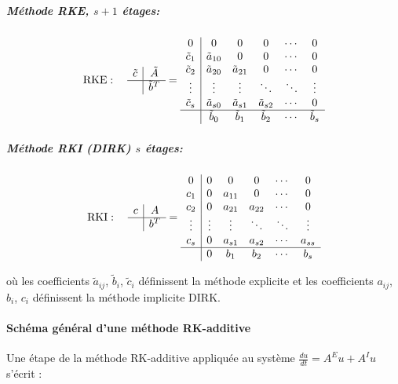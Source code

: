         \subparagraph{Méthode RKE, $s+1$ étages:}
        \begin{align}
        \text{RKE} : \quad
        \begin{array}{c|c}
        \tilde{c} & \tilde{A} \\
        \hline
        & \tilde{b}^T
        \end{array}
        =
        \begin{array}{c|ccccc}
        0 & 0 & 0 & 0 & \cdots & 0 \\
        \tilde{c}_1 & \tilde{a}_{10} & 0 & 0 & \cdots & 0 \\
        \tilde{c}_2 & \tilde{a}_{20} & \tilde{a}_{21} & 0 & \cdots & 0 \\
        \vdots & \vdots & \vdots & \ddots & \ddots & \vdots \\
        \tilde{c}_s & \tilde{a}_{s0} & \tilde{a}_{s1} & \tilde{a}_{s2} & \cdots & 0 \\
        \hline
        & \tilde{b}_0 & \tilde{b}_1 & \tilde{b}_2 & \cdots & \tilde{b}_s
        \end{array}
        \end{align}
        
        \subparagraph{Méthode RKI (DIRK) $s$ étages:}
        \begin{align}
        \text{RKI} : \quad
        \begin{array}{c|c}
        c & A \\
        \hline
        & b^T
        \end{array}
        =
        \begin{array}{c|ccccc}
        0 & 0 & 0 & 0 & \cdots & 0 \\
        c_1 & 0 & a_{11} & 0 & \cdots & 0 \\
        c_2 & 0 & a_{21} & a_{22} & \cdots & 0 \\
        \vdots & \vdots & \vdots & \ddots & \ddots & \vdots \\
        c_s & 0 & a_{s1} & a_{s2} & \cdots & a_{ss} \\
        \hline
        & 0 & b_1 & b_2 & \cdots & b_s
        \end{array}
        \end{align}
        
        où les coefficients $\tilde{a}_{ij}$, $\tilde{b}_i$, $\tilde{c}_i$ définissent la méthode explicite et 
        les coefficients $a_{ij}$, $b_i$, $c_i$ définissent la méthode implicite DIRK. 
        
    \paragraph{Schéma général d'une méthode RK-additive}
        Une étape de la méthode RK-additive appliquée au système 
        $\frac{du}{dt} = A^E u + A^I u$ s'écrit :
        
